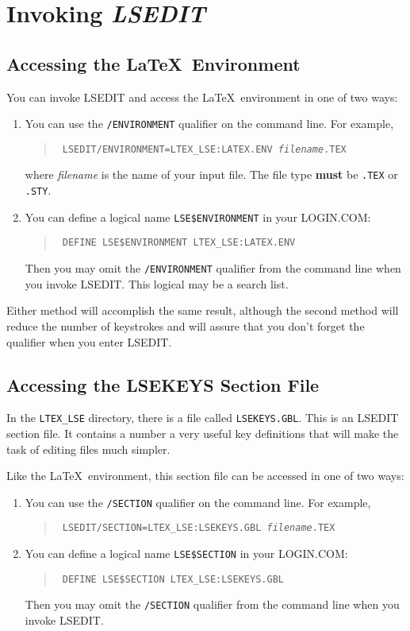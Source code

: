 \section{Invoking {\sl LSEDIT\/}}

\subsection{Accessing the \LaTeX\ Environment} 
 
You can invoke LSEDIT and access the \LaTeX\ environment in one of two ways:

\begin{enumerate}
\item You can use the {\tt /ENVIRONMENT} qualifier on the command line. For
example,
\begin{quote}
\tt
\prompt{} LSEDIT/ENVIRONMENT=LTEX\_LSE:LATEX.ENV {\it filename\/}.TEX \hfil
\end{quote}
where {\it filename\/} is the name of your input file.  The file type {\bf 
must} be {\tt .TEX} or {\tt .STY}.

\item You can define a logical name {\tt LSE\$ENVIRONMENT} in your LOGIN.COM:
\begin{quote}
\tt
\prompt{} DEFINE LSE\$ENVIRONMENT LTEX\_LSE:LATEX.ENV \hfil
\end{quote}
Then you may omit the {\tt /ENVIRONMENT} qualifier from the command line when
you invoke LSEDIT. This logical may be a search list.
\end{enumerate}

Either method will accomplish the same result, although the second method will
reduce the number of keystrokes and will assure that you don't forget the
qualifier when you enter LSEDIT.

\subsection{Accessing the LSEKEYS Section File}

In the \verb|LTEX_LSE| directory, there is a file called \verb|LSEKEYS.GBL|. 
This is an LSEDIT section file. It contains a number a very useful key
definitions that will make the task of editing files much simpler.

Like the \LaTeX\ environment, this section file can be accessed in one of two
ways:
\begin{enumerate}
\item You can use the {\tt /SECTION} qualifier on the command line. For
example,
\begin{quote}
\tt
\prompt{} LSEDIT/SECTION=LTEX\_LSE:LSEKEYS.GBL {\it filename\/}.TEX \hfil
\end{quote}

\item You can define a logical name {\tt LSE\$SECTION} in your LOGIN.COM:
\begin{quote}
\tt
\prompt{} DEFINE LSE\$SECTION LTEX\_LSE:LSEKEYS.GBL \hfil
\end{quote}
Then you may omit the {\tt /SECTION} qualifier from the command line when
you invoke LSEDIT. 
\end{enumerate}

